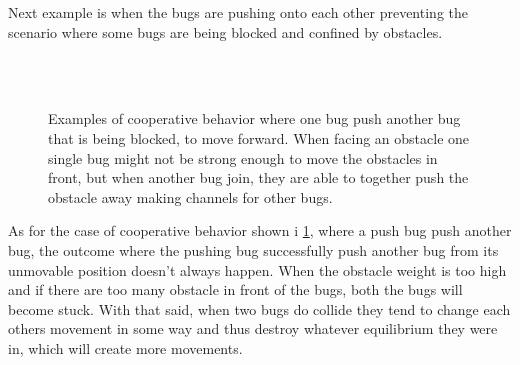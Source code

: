 Next example is when the bugs are pushing onto each other preventing the scenario where some bugs 
are being blocked and confined by obstacles.

\begin{figure}[htpb!]
\centering
\captionsetup[subfigure]{labelformat=empty}
 \quad
{} \quad
{} \quad
{} \\
 \quad
{} \quad
{} \quad
{} \\
 \quad
{} \quad
{} \quad
{}

\caption{Examples of cooperative behavior where one 
bug push another bug that is being blocked, to move forward. When facing an obstacle one single bug might not be strong 
enough to move the obstacles in front, but when another bug join, they are able to together push the obstacle away 
making channels for other bugs.
} 
\label{fig:CBP}
\end{figure}


As for the case of cooperative behavior shown i \cref{fig:CBP}, where a push bug push another 
bug, the outcome where the pushing bug successfully push another bug from its unmovable position 
doesn't always happen. When the obstacle weight is too high and if there are too many obstacle 
in front of the bugs, both the bugs will become stuck. With that said, when two bugs do collide 
they tend to change each others movement in some way and thus destroy whatever equilibrium they 
were in, which will create more movements.

